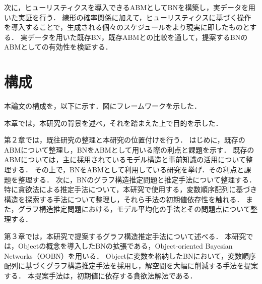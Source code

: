 次に，ヒューリスティクスを導入できるABMとしてBNを構築し，実データを用いた実証を行う．
線形の確率関係に加えて，ヒューリスティクスに基づく操作を導入することで，生成される個々のスケジュールをより現実に即したものとする．
実データを用いた既存BN，既存ABMとの比較を通して，提案するBNのABMとしての有効性を検証する．

\section{構成}\label{1.3}
本論文の構成を，以下に示す．図にフレームワークを示した．

本章では，本研究の背景を述べ，それを踏まえた上で目的を示した．

第２章では，既往研究の整理と本研究の位置付けを行う．
はじめに，既存のABMについて整理し，BNをABMとして用いる際の利点と課題を示す．
既存のABMについては，主に採用されているモデル構造と事前知識の活用について整理する．
その上で，BNをABMとして利用している研究を挙げ．その利点と課題を整理する．
次に，BNのグラフ構造推定問題と推定手法について整理する．
特に貪欲法による推定手法について，本研究で使用する，変数順序配列に基づき構造を探索する手法について整理し，それら手法の初期値依存性を触れる．
また，グラフ構造推定問題における，モデル平均化の手法とその問題点について整理する．

第３章では，本研究で提案するグラフ構造推定手法について述べる．
本研究では，Objectの概念を導入したBNの拡張である，Object-oriented Bayesian Networks（OOBN）を用いる．
Objectに変数を格納したBNにおいて，変数順序配列に基づくグラフ構造推定手法を採用し，解空間を大幅に削減する手法を提案する．
本提案手法は，初期値に依存する貪欲法解法である．

